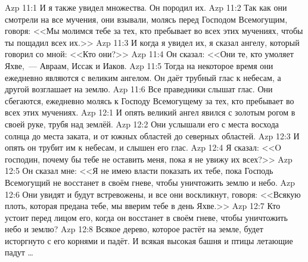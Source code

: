 \vs Azp 11:1
И я также увидел множества.
Он породил их.
\vs Azp 11:2
Так как они смотрели на все мучения,
они взывали, молясь перед Господом Всемогущим,
говоря:
<<Мы молимся тебе за тех, кто пребывает
во всех этих мучениях, чтобы ты пощадил всех их.>>
\vs Azp 11:3
И когда я увидел их, я сказал ангелу, который говорил со мной:
<<Кто они?>>
\vs Azp 11:4
Он сказал:
<<Они те, кто умоляет Яхве,~--- Авраам, Иссак и Иаков.
\vs Azp 11:5
Тогда на некоторое время они ежедневно являются с великим ангелом.
Он даёт трубный глас к небесам, а другой возглашает на землю.
\vs Azp 11:6
Все праведники слышат глас.
Они сбегаются, ежедневно молясь к Господу Всемогущему
за тех, кто пребывает во всех этих мучениях.
\vs Azp 12:1
И опять великий ангел явился с золотым рогом в своей руке,
трубя над землёй.
\vs Azp 12:2
Они услышали его с места восхода солнца до места заката,
и от южных областей до северных областей.
\vs Azp 12:3
И опять он трубит им к небесам, и слышен его глас.
\vs Azp 12:4
Я сказал:
<<O господин, почему бы тебе не оставить меня,
пока я не увижу их всех?>>
\vs Azp 12:5
Он сказал мне:
<<Я не имею власти показать их тебе,
пока Господь Всемогущий не восстанет в своём гневе,
чтобы уничтожить землю и небо.
\vs Azp 12:6
Они увидят и будут встревожены,
и все они воскликнут, говоря:
<<Всякую плоть, которая предана тебе,
мы вверим тебе в день Яхве.>>
\vs Azp 12:7
Кто устоит перед лицом его,
когда он восстанет в своём гневе,
чтобы уничтожить небо и землю?
\vs Azp 12:8
Всякое дерево, которое растёт на земле,
будет исторгнуто с его корнями и падёт.
И всякая высокая башня и птицы летающие падут \ldots
